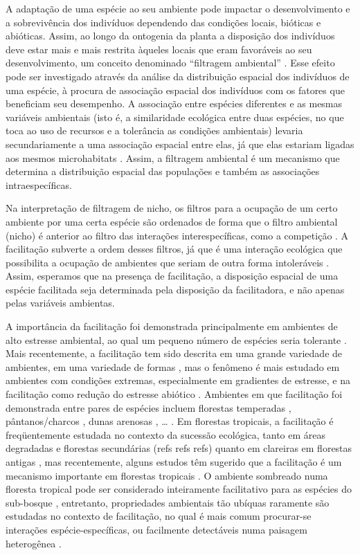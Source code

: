 \documentclass[twoside,12pt,a4paper]{report}
\begin{document}
A adaptação de uma espécie ao seu ambiente pode impactar o desenvolvimento e a sobrevivência dos
indivíduos dependendo das condições locais, bióticas e abióticas. Assim, ao longo da ontogenia da
planta a disposição dos indivíduos deve estar mais e mais restrita àqueles locais que eram
favoráveis ao seu desenvolvimento, um conceito denominado “filtragem ambiental” \citep{ref}. Esse efeito
pode ser investigado através da análise da distribuição espacial dos indivíduos de uma espécie, à
procura de associação espacial dos indivíduos com os fatores que beneficiam seu desempenho. A
associação entre espécies diferentes e as mesmas variáveis ambientais (isto é, a similaridade
ecológica entre duas espécies, no que toca ao uso de recursos e a tolerância as condições
ambientais) levaria secundariamente a uma associação espacial entre elas, já que elas estariam
ligadas aos mesmos microhabitats \citep{Velazquez2015}. Assim, a filtragem ambiental é um
mecanismo que determina a distribuição espacial das populações e também as associações
intraespecíficas.

Na interpretação de filtragem de nicho, os filtros para a ocupação de um certo ambiente por uma
certa espécie são ordenados de forma que o filtro ambiental (nicho) é anterior ao filtro das
interações interespecíficas, como a competição \citep{Grimes}. A facilitação subverte a ordem desses
filtros, já que é uma interação ecológica que possibilita a ocupação de ambientes que seriam de
outra forma intoleráveis \citep{Lortie2004}. Assim, esperamos que na presença de facilitação, a
disposição espacial de uma espécie facilitada seja determinada pela disposição da facilitadora, e
não apenas pelas variáveis ambientas.

A importância da facilitação foi demonstrada principalmente em ambientes de alto estresse ambiental,
ao qual um pequeno número de espécies seria tolerante \citep{BertnessHacker1994, Brooker2008}. 
Mais recentemente, a facilitação tem sido descrita em uma grande variedade de ambientes, em
uma variedade de formas \citep{McIntire2014}, mas o fenômeno é mais estudado em ambientes com
condições extremas, especialmente em gradientes de estresse, e na facilitação como redução do
estresse abiótico \citep{Brooker2008}. Ambientes em que facilitação foi demonstrada entre pares de
espécies incluem florestas temperadas \citep{refs}, pântanos/charcos \citep{BertnessHacker1994, etc},
dunas arenosas \citep{Castanho2014, etc}, … . Em florestas tropicais, a facilitação é freqüentemente
estudada no contexto da sucessão ecológica, tanto em áreas degradadas e florestas secundárias (refs
refs refs) quanto em clareiras em florestas antigas \citep{refs refs refs}, mas recentemente, alguns
estudos têm sugerido que a facilitação é um mecanismo importante em florestas tropicais
\citep{Ledo2015,refs}. O ambiente sombreado numa
floresta tropical pode ser considerado inteiramente facilitativo para as espécies do sub-bosque
\citep{McIntire2014}, entretanto, propriedades ambientais tão ubíquas raramente são estudadas
no contexto de facilitação, no qual é mais comum procurar-se interações espécie-específicas, ou
facilmente detectáveis numa paisagem heterogênea \citep{TODO procurar refs}.
\end{document}
